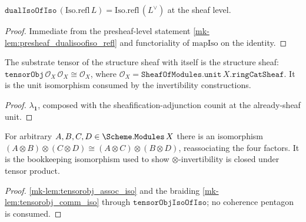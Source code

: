 \begin{lemma}\label{mk-lem:dualisoofiso_refl}
  \leanok

  \(\mathtt{dualIsoOfIso}\,(\mathrm{Iso.refl}\,L) = \mathrm{Iso.refl}\,(L^{\vee})\) at the sheaf
  level.
\end{lemma}
\begin{proof}
  \leanok
  Immediate from the presheaf-level statement \ref{mk-lem:presheaf_dualisoofiso_refl} and
  functoriality of \(\mathrm{mapIso}\) on the identity.
\end{proof}

\begin{definition}\label{mk-def:tensorobj_unit_self_iso}
  \leanok

  The substrate tensor of the structure sheaf with itself is the structure sheaf:
  \(\mathtt{tensorObj}\,\mathcal{O}_X\,\mathcal{O}_X \cong \mathcal{O}_X\), where
  \(\mathcal{O}_X = \mathtt{SheafOfModules.unit}\,X.\mathtt{ringCatSheaf}\). It is the unit
  isomorphism consumed by the invertibility constructions.
\end{definition}
\begin{proof}
  \leanok
  \(\lambda_{\mathbf{1}}\), composed with the sheafification-adjunction counit at the
  already-sheaf unit.
\end{proof}

\begin{definition}\label{mk-def:tensorobj_middlefour}
  \leanok

  For arbitrary \(A,B,C,D \in \Scheme.\mathtt{Modules}\,X\) there is an isomorphism
  \((A \otimes B) \otimes (C \otimes D) \cong (A \otimes C) \otimes (B \otimes D)\),
  reassociating the four factors. It is the bookkeeping isomorphism used to show
  \(\otimes\)-invertibility is closed under tensor product.
\end{definition}
\begin{proof}
  \leanok
  \ref{mk-lem:tensorobj_assoc_iso} and the braiding \ref{mk-lem:tensorobj_comm_iso} through
  \(\mathtt{tensorObjIsoOfIso}\); no coherence pentagon is consumed.
\end{proof}

